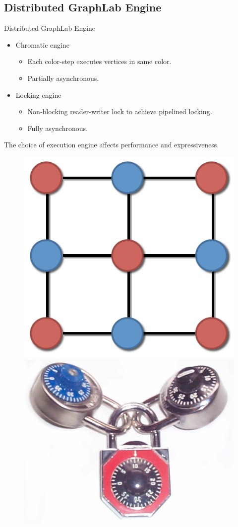 \documentclass[onlymath,xcolor=pdftex,dvipsnames,table]{beamer}
\theoremstyle{remark} %
\begin{document}
\subsection{Distributed GraphLab Engine}
\begin{frame}{Distributed GraphLab Engine}
  \begin{itemize}
    \item Chromatic engine
    \begin{itemize}
      \item Each color-step executes vertices in same color.
      \item Partially asynchronous.
    \end{itemize}
    \item Locking engine
    \begin{itemize}
      \item Non-blocking reader-writer lock to achieve pipelined locking.
      \item Fully asynchronous.
    \end{itemize}
  \end{itemize}
  The choice of execution engine affects performance and expressiveness.
  \begin{figure}[htbp]
    \centering
    \subfigure{}
      \includegraphics[width=.25\textwidth]{color.pdf}\hspace{.75in}
    \subfigure{}
      \includegraphics[width=.25\textwidth]{locks.jpg}
  \end{figure}
\end{frame}

\end{document}
